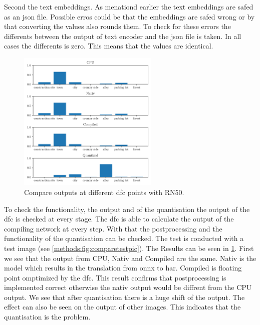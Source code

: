 Second the text embeddings.
As menationd earlier the text embeddings are safed as an json file.
Possible erros could be that the embeddings are safed wrong or by that converting the values also rounds them.
To check for these errors the differents between the output of text encoder and the json file is taken.
In all cases the differents is zero.
This means that the values are identical.

\begin{figure}[h]
    \centering
    \includegraphics[width=0.6\textwidth]{Images/Implementation/compareProbs_RN50.png}
    \caption{Compare outputs at different \acrshort{dfc} points with RN50.}
    \label{methods:fig:comparern50}
\end{figure}

To check the functionality, the output and of the quantisation the output of the \acrshort{dfc} is checked at every stage.
The \acrshort{dfc} is able to calculate the output of the compiling network at every step.
With that the postprocessing and the functionality of the quantisation can be checked.
The test is conducted with a test image (see \cref{methods:fig:comparetestpic}).
The Results can be seen in \cref{methods:fig:comparern50}.
First we see that the output from CPU, Nativ and Compiled are the same.
Nativ is the model which results in the translation from onnx to \acrshort{har}.
Compiled is floating point omptimized by the \acrshort{dfc}.
This result confirms that postprocessing is implemented correct otherwise the nativ output would be diffrent from the CPU output.
We see that after quantisation there is a huge shift of the output.
The effect can also be seen on the output of other images.
This indicates that the quantisation is the problem.

